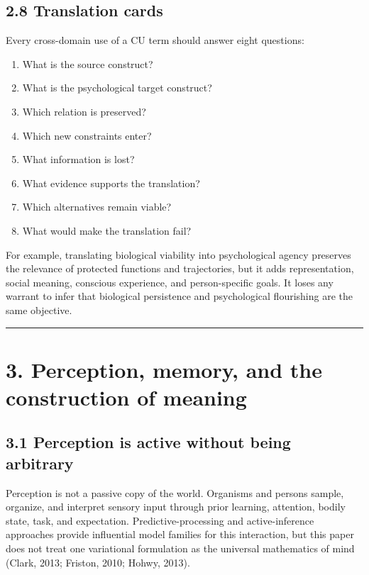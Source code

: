 \documentclass[
  11pt,
]{article}
\providecommand{\tightlist}{%
  \setlength{\itemsep}{0pt}\setlength{\parskip}{0pt}}
\begin{document}
\subsection{2.8 Translation cards}\label{translation-cards}

Every cross-domain use of a CU term should answer eight questions:

\begin{enumerate}
\def\labelenumi{\arabic{enumi}.}
\tightlist
\item
  What is the source construct?
\item
  What is the psychological target construct?
\item
  Which relation is preserved?
\item
  Which new constraints enter?
\item
  What information is lost?
\item
  What evidence supports the translation?
\item
  Which alternatives remain viable?
\item
  What would make the translation fail?
\end{enumerate}

For example, translating biological viability into psychological agency
preserves the relevance of protected functions and trajectories, but it
adds representation, social meaning, conscious experience, and
person-specific goals. It loses any warrant to infer that biological
persistence and psychological flourishing are the same objective.

\begin{center}\rule{0.5\linewidth}{0.5pt}\end{center}

\section{3. Perception, memory, and the construction of
meaning}\label{perception-memory-and-the-construction-of-meaning}

\subsection{3.1 Perception is active without being
arbitrary}\label{perception-is-active-without-being-arbitrary}

Perception is not a passive copy of the world. Organisms and persons
sample, organize, and interpret sensory input through prior learning,
attention, bodily state, task, and expectation. Predictive-processing
and active-inference approaches provide influential model families for
this interaction, but this paper does not treat one variational
formulation as the universal mathematics of mind (Clark, 2013; Friston,
2010; Hohwy, 2013).
\end{document}

